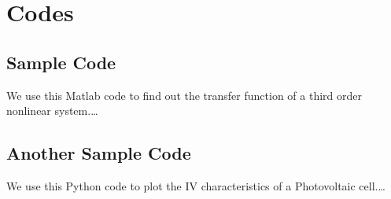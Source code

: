 
\chapter{Codes}\label{ch:codes}

\section{Sample Code}

We use this Matlab code to find out the transfer function of a third order nonlinear system.\dots




\section{Another Sample Code}
We use this Python code to plot the IV characteristics of a Photovoltaic cell.\dots


\endinput


Here is the figure plotted by TIKZ


